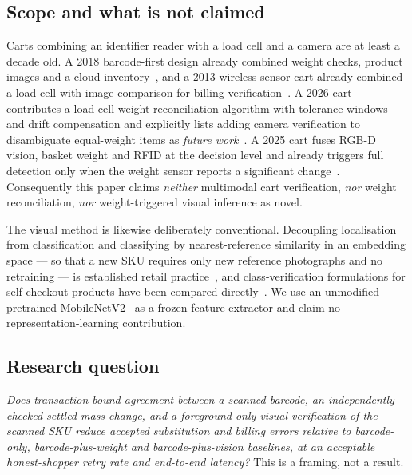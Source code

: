 \documentclass[conference]{IEEEtran}
\begin{document}
\subsection{Scope and what is not claimed}
Carts combining an identifier reader with a load cell and a camera are at least a decade old. A 2018
barcode-first design already combined weight checks, product images and a cloud
inventory~\cite{R84}, and a 2013 wireless-sensor cart already combined a load cell with image
comparison for billing verification~\cite{R85}. A 2026 cart contributes a load-cell
weight-reconciliation algorithm with tolerance windows and drift compensation and explicitly lists
adding camera verification to disambiguate equal-weight items as \emph{future work}~\cite{R02}. A
2025 cart fuses RGB-D vision, basket weight and RFID at the decision level and already triggers full
detection only when the weight sensor reports a significant change~\cite{R01}. Consequently this
paper claims \emph{neither} multimodal cart verification, \emph{nor} weight reconciliation, \emph{nor}
weight-triggered visual inference as novel.

The visual method is likewise deliberately conventional. Decoupling localisation from classification
and classifying by nearest-reference similarity in an embedding space --- so that a new SKU requires
only new reference photographs and no retraining --- is established retail practice~\cite{R07}, and
class-verification formulations for self-checkout products have been compared directly~\cite{R52}. We
use an unmodified pretrained MobileNetV2~\cite{R31} as a frozen feature extractor and claim no
representation-learning contribution.

\subsection{Research question}
\emph{Does transaction-bound agreement between a scanned barcode, an independently checked settled
mass change, and a foreground-only visual verification of the scanned SKU reduce accepted
substitution and billing errors relative to barcode-only, barcode-plus-weight and
barcode-plus-vision baselines, at an acceptable honest-shopper retry rate and end-to-end latency?}
This is a framing, not a result.
\end{document}
